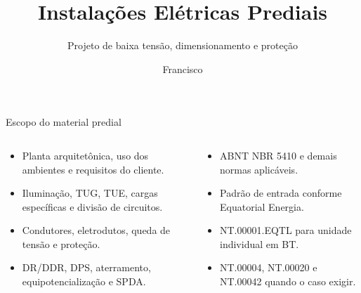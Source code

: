 \documentclass[11pt,aspectratio=169]{beamer}
\title{Instalações Elétricas Prediais}
\subtitle{Projeto de baixa tensão, dimensionamento e proteção}
\author{Francisco}
\institute{Material teórico — Predial}
\date{ }
\begin{document}
{\begin{frame}\titlepage\end{frame}}

\begin{frame}{Escopo do material predial}\small
\begin{columns}[T,onlytextwidth]
\begin{caixaNorma}[title=Do levantamento ao projeto]\begin{itemize}
\item Planta arquitetônica, uso dos ambientes e requisitos do cliente.
\item Iluminação, TUG, TUE, cargas específicas e divisão de circuitos.
\item Condutores, eletrodutos, queda de tensão e proteção.
\item DR/DDR, DPS, aterramento, equipotencialização e SPDA.
\end{itemize}\end{caixaNorma}
\begin{caixaProjeto}[title=Aplicação no Maranhão]\begin{itemize}
\item ABNT NBR 5410 e demais normas aplicáveis.
\item Padrão de entrada conforme Equatorial Energia.
\item NT.00001.EQTL para unidade individual em BT.
\item NT.00004, NT.00020 e NT.00042 quando o caso exigir.
\end{itemize}\end{caixaProjeto}\end{columns}
\end{frame}
















\end{document}
